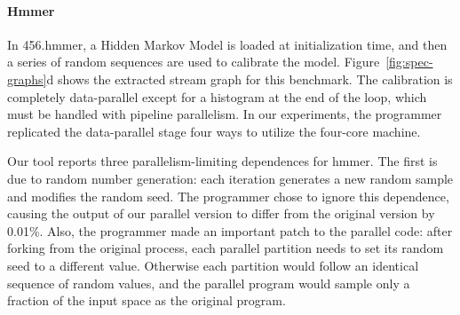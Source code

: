 


\paragraph*{Hmmer} In 456.hmmer, a Hidden Markov Model is loaded at
initialization time, and then a series of random sequences are used to
calibrate the model.  Figure~\ref{fig:spec-graphs}d shows the
extracted stream graph for this benchmark.  The calibration is
completely data-parallel except for a histogram at the end of the
loop, which must be handled with pipeline parallelism.  In our
experiments, the programmer replicated the data-parallel stage four
ways to utilize the four-core machine.

Our tool reports three parallelism-limiting dependences for hmmer.
The first is due to random number generation: each iteration generates
a new random sample and modifies the random seed.  The programmer
chose to ignore this dependence, causing the output of our parallel
version to differ from the original version by 0.01\%.  Also, the
programmer made an important patch to the parallel code: after forking
from the original process, each parallel partition needs to set its
random seed to a different value.  Otherwise each partition would
follow an identical sequence of random values, and the parallel
program would sample only a fraction of the input space as the
original program.

